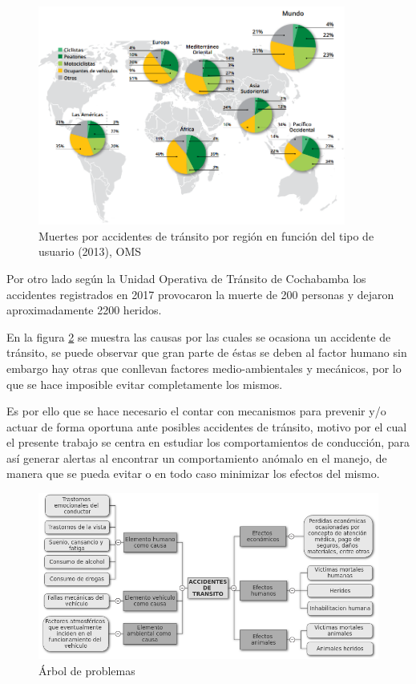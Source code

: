 \begin{figure}[h!]
  \begin{center}	\includegraphics[width=0.9\textwidth]{imagenes/Cap1/oms1}
  \caption{Muertes por accidentes de tránsito por regi\'{o}n en función del tipo de usuario (2013), OMS}
  \label{fig:oms}  
  \end{center}
\end{figure}

Por otro lado seg\'{u}n la Unidad Operativa de Tr\'{a}nsito de Cochabamba los accidentes registrados en 2017 provocaron la muerte de 200 personas y dejaron aproximadamente 2200 heridos.
	
\vspace{5mm} %

En la figura \ref{fig:arbol} se muestra las causas por las cuales se ocasiona un accidente de tr\'{a}nsito, se puede observar que gran parte de \'{e}stas se deben al factor humano sin embargo hay otras que conllevan factores medio-ambientales y mec\'{a}nicos, por lo que se hace imposible evitar completamente los mismos. 

\vspace{5mm} %

Es por ello que se hace necesario el contar con mecanismos para prevenir y/o actuar de forma oportuna ante posibles accidentes de tr\'{a}nsito, motivo por el cual el presente trabajo se centra en estudiar los comportamientos de conducci\'{o}n, para as\'{i} generar alertas al encontrar un comportamiento an\'{o}malo en el manejo, de manera que se pueda evitar o en todo caso minimizar los efectos del mismo.

\begin{figure}[h!]
  \begin{center}	\includegraphics[width=1.0\textwidth]{imagenes/Cap1/arbol_p}
  \caption{\'{A}rbol de problemas}
  \label{fig:arbol}
  \end{center}
\end{figure}

